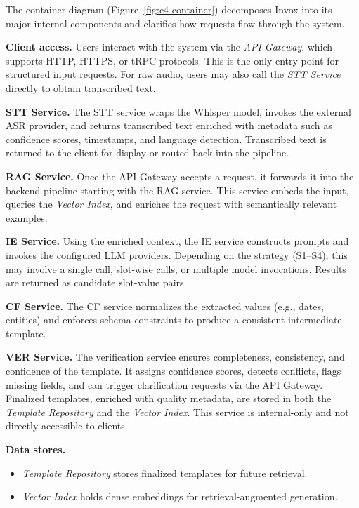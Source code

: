 The container diagram (Figure~\ref{fig:c4-container}) decomposes Invox into its major internal components and clarifies how requests flow through the system.

\textbf{Client access.} Users interact with the system via the \emph{API Gateway}, which supports HTTP, HTTPS, or tRPC protocols. This is the only entry point for structured input requests. For raw audio, users may also call the \emph{STT Service} directly to obtain transcribed text.

\textbf{STT Service.} The STT service wraps the Whisper model, invokes the external ASR provider, and returns transcribed text enriched with metadata such as confidence scores, timestamps, and language detection. Transcribed text is returned to the client for display or routed back into the pipeline.

\textbf{RAG Service.} Once the API Gateway accepts a request, it forwards it into the backend pipeline starting with the RAG service. This service embeds the input, queries the \emph{Vector Index}, and enriches the request with semantically relevant examples.

\textbf{IE Service.} Using the enriched context, the IE service constructs prompts and invokes the configured LLM providers. Depending on the strategy (S1–S4), this may involve a single call, slot-wise calls, or multiple model invocations. Results are returned as candidate slot-value pairs.

\textbf{CF Service.} The CF service normalizes the extracted values (e.g., dates, entities) and enforces schema constraints to produce a consistent intermediate template.

\textbf{VER Service.} 
The verification service ensures completeness, consistency, and confidence of the template. It assigns confidence scores, detects conflicts, flags missing fields, and can trigger clarification requests via the API Gateway. Finalized templates, enriched with quality metadata, are stored in both the \emph{Template Repository} and the \emph{Vector Index}. This service is internal-only and not directly accessible to clients.

\textbf{Data stores.} 
\begin{itemize}
  \item \emph{Template Repository} stores finalized templates for future retrieval.
  \item \emph{Vector Index} holds dense embeddings for retrieval-augmented generation.
\end{itemize}

